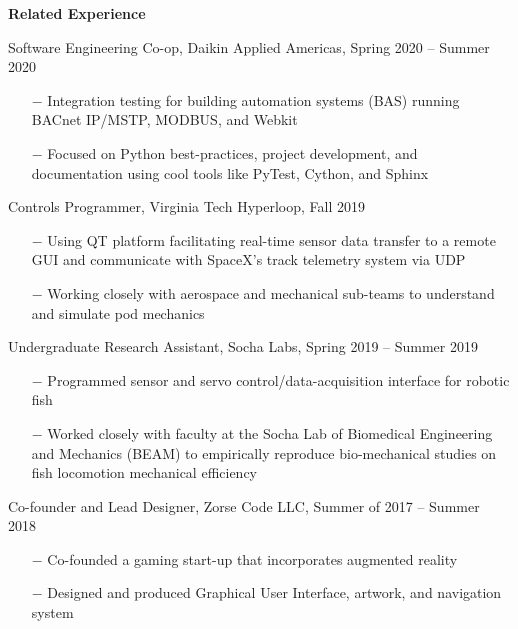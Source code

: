 \documentclass{article}
\begin{document}
\vline

\textbf{\large{Related Experience}} 

\vspace{5pt}

{\setlength{\leftskip}{15pt}

{\selectfont Software Engineering Co-op, Daikin Applied Americas, Spring 2020 – Summer 2020}
\vspace{-5pt}
\begin{itemize}
	\setlength{\leftskip}{15pt}
	\setlength\itemsep{-0.5em}
	\item[$-$] Integration testing for building automation systems (BAS) running BACnet IP/MSTP, MODBUS, and Webkit 
	\item[$-$] Focused on Python best-practices, project development, and documentation using cool tools like PyTest, Cython, and Sphinx
\end{itemize}

{\selectfont Controls Programmer, Virginia Tech Hyperloop, Fall 2019}
\vspace{-5pt}
\begin{itemize}
	\setlength{\leftskip}{15pt}
	\setlength\itemsep{-0.5em}
	\item[$-$] Using QT platform facilitating real-time sensor data transfer to a remote GUI and communicate with SpaceX's track telemetry system via UDP
	\item[$-$] Working closely with aerospace and mechanical sub-teams to understand and simulate pod mechanics
\end{itemize}

{\selectfont Undergraduate Research Assistant, Socha Labs, Spring 2019 – Summer 2019}
\vspace{-5pt}
\begin{itemize}
	\setlength{\leftskip}{15pt}
	\setlength\itemsep{-0.5em}
	\item[$-$] Programmed sensor and servo control/data-acquisition interface for robotic fish
	\item[$-$] Worked closely with faculty at the Socha Lab of Biomedical Engineering and Mechanics (BEAM) to empirically reproduce bio-mechanical studies on fish locomotion mechanical efficiency
\end{itemize}

{\selectfont Co-founder and Lead Designer, Zorse Code LLC, Summer of 2017 – Summer 2018}
\vspace{-5pt}
\begin{itemize}
	\setlength{\leftskip}{15pt}
	\setlength\itemsep{-0.5em}
	\item[$-$] Co-founded a gaming start-up that incorporates augmented reality 
	\item[$-$] Designed and produced Graphical User Interface, artwork, and navigation system
\end{itemize}

}
\end{document}
